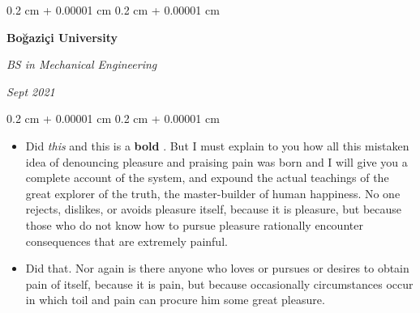 \documentclass[10pt, letterpaper]{article}
\newenvironment{highlights}{
    \begin{itemize}[
        topsep=0.10 cm,
        parsep=0.10 cm,
        partopsep=0pt,
        itemsep=0pt,
        leftmargin=0.4 cm + 10pt
    ]
}{
    \end{itemize}
} %
\newenvironment{onecolentry}{
    \begin{adjustwidth}{
        0.2 cm + 0.00001 cm
    }{
        0.2 cm + 0.00001 cm
    }
}{
    \end{adjustwidth}
} %
\newenvironment{twocolentry}[2][]{
    \onecolentry
    \def\secondColumn{#2}
    \setcolumnwidth{\fill, 4.5 cm}
    \begin{paracol}{2}
}{
    \switchcolumn \raggedleft \secondColumn
    \end{paracol}
    \endonecolentry
} %
\let\hrefWithoutArrow\href
\renewcommand{\href}[2]{\hrefWithoutArrow{#1}{\ifthenelse{\equal{#2}{}}{ }{#2 }\raisebox{.15ex}{\footnotesize \faExternalLink*}}}
\begin{document}
        \vspace{0.2 cm}

        \begin{twocolentry}{
            
            
        \textit{Sept 2021}}
            \textbf{Boğaziçi University}

            \textit{BS in Mechanical Engineering}
        \end{twocolentry}
        \vspace{0.10 cm}
        \begin{onecolentry}
            \begin{highlights}
                \item Did \textit{this} and this is a \textbf{bold} \href{https://example.com}{link}. But I must explain to you how all this mistaken idea of denouncing pleasure and praising pain was born and I will give you a complete account of the system, and expound the actual teachings of the great explorer of the truth, the master-builder of human happiness. No one rejects, dislikes, or avoids pleasure itself, because it is pleasure, but because those who do not know how to pursue pleasure rationally encounter consequences that are extremely painful.
                \item Did that. Nor again is there anyone who loves or pursues or desires to obtain pain of itself, because it is pain, but because occasionally circumstances occur in which toil and pain can procure him some great pleasure.
            \end{highlights}
        \end{onecolentry}


        \vspace{0.2 cm}
\end{document}

